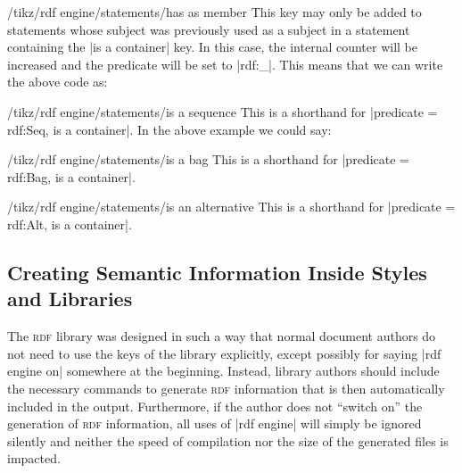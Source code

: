 \begin{key}{/tikz/rdf engine/statements/has as member}
  This key may only be added to statements whose subject was
  previously used as a subject in a statement containing the
  |is a container| key. In this case, the internal counter will be
  increased and the predicate will be set to |rdf:_|. This
  means that we can write the above code as:
\begin{codeexample}
\end{codeexample}
\end{key}

\begin{key}{/tikz/rdf engine/statements/is a sequence}
  This is a shorthand for |predicate = rdf:Seq, is a container|. In the
  above example we could say:
\begin{codeexample}
\end{codeexample}
\end{key}


\begin{key}{/tikz/rdf engine/statements/is a bag}
  This is a shorthand for |predicate = rdf:Bag, is a container|.
\end{key} 


\begin{key}{/tikz/rdf engine/statements/is an alternative}
  This is a shorthand for |predicate = rdf:Alt, is a container|.
\end{key}


\subsection{Creating Semantic Information Inside Styles and Libraries}

\begingroup

The \textsc{rdf} library was designed in such a way that normal
document authors do not need to use the keys of the library
explicitly, except possibly for saying |rdf engine on| somewhere at
the beginning. Instead, library authors should include the necessary
commands to generate \textsc{rdf} information that is then
automatically included in the output. Furthermore, if the author does
not ``switch on'' the generation of \textsc{rdf} information, all uses
of |rdf engine| will simply be ignored silently and neither the speed
of compilation nor the size of the generated files is impacted.


